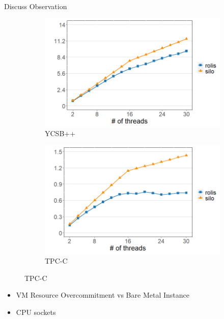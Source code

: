 \documentclass[notes, xcolor=dvipsnames]{beamer}
\begin{document}
    \begin{frame}{Discuss Observation}

        \begin{figure}
            \begin{subfigure}[h]{0.5\textwidth}
                \includegraphics[scale=0.30]{fig10_ycsb.png}
                \caption{YCSB++}
            \end{subfigure}%
            \hfill
            \begin{subfigure}[h]{0.5\textwidth}
                \includegraphics[scale=0.30]{fig10_tpcc.png}
                \caption{TPC-C}
            \end{subfigure}
        \end{figure}

        \begin{itemize}
            \item VM Resource Overcommitment vs Bare Metal Instance 
            \item CPU sockets
        \end{itemize}

    \end{frame}
\end{document}
